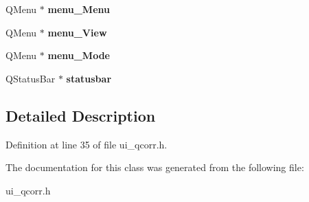 \begin{DoxyCompactItemize}
\item 
\hypertarget{classUi__QcorrClass_a1d52a371f0d1e29cdf70d1be2a85a45e}{
QMenu $\ast$ {\bfseries menu\_\-Menu}}
\label{classUi__QcorrClass_a1d52a371f0d1e29cdf70d1be2a85a45e}

\item 
\hypertarget{classUi__QcorrClass_a8c1dd90b9ea2130b6fe6e8e6553fbf13}{
QMenu $\ast$ {\bfseries menu\_\-View}}
\label{classUi__QcorrClass_a8c1dd90b9ea2130b6fe6e8e6553fbf13}

\item 
\hypertarget{classUi__QcorrClass_a34c81836d3bddde0adb968fe98fba156}{
QMenu $\ast$ {\bfseries menu\_\-Mode}}
\label{classUi__QcorrClass_a34c81836d3bddde0adb968fe98fba156}

\item 
\hypertarget{classUi__QcorrClass_ae220680c312c600f015f0413ad6cd2cf}{
QStatusBar $\ast$ {\bfseries statusbar}}
\label{classUi__QcorrClass_ae220680c312c600f015f0413ad6cd2cf}

\end{DoxyCompactItemize}


\subsection{Detailed Description}


Definition at line 35 of file ui\_\-qcorr.h.

The documentation for this class was generated from the following file:\begin{DoxyCompactItemize}
\item 
ui\_\-qcorr.h\end{DoxyCompactItemize}
